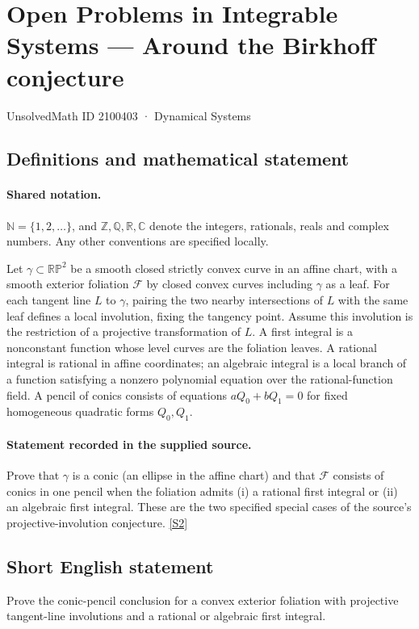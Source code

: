 \documentclass[11pt]{article}
\newcommand{\sref}[2]{\hyperlink{source:#1:#2}{[S#2]}}
\begin{document}
\setcounter{section}{2100402}
\section{Open Problems in Integrable Systems — Around the Birkhoff conjecture}\label{2100403}
{\small\sffamily UnsolvedMath ID 2100403 · Dynamical Systems}
\subsection{Definitions and mathematical statement}

\paragraph{Shared notation.}$\mathbb N=\{1,2,\ldots\}$, and $\mathbb Z,\mathbb Q,\mathbb R,\mathbb C$ denote the integers, rationals, reals and complex numbers. Any other conventions are specified locally.


Let $\gamma\subset\mathbb{RP}^2$ be a smooth closed strictly convex curve in an affine chart, with a smooth exterior foliation $\mathcal F$ by closed convex curves including $\gamma$ as a leaf. For each tangent line $L$ to $\gamma$, pairing the two nearby intersections of $L$ with the same leaf defines a local involution, fixing the tangency point. Assume this involution is the restriction of a projective transformation of $L$. A first integral is a nonconstant function whose level curves are the foliation leaves. A rational integral is rational in affine coordinates; an algebraic integral is a local branch of a function satisfying a nonzero polynomial equation over the rational-function field. A pencil of conics consists of equations $aQ_0+bQ_1=0$ for fixed homogeneous quadratic forms $Q_0,Q_1$.
\paragraph{Statement recorded in the supplied source.}
Prove that $\gamma$ is a conic (an ellipse in the affine chart) and that $\mathcal F$ consists of conics in one pencil when the foliation admits (i) a rational first integral or (ii) an algebraic first integral. These are the two specified special cases of the source's projective-involution conjecture. \sref{2100403}{2}
\subsection{Short English statement}
Prove the conic-pencil conclusion for a convex exterior foliation with projective tangent-line involutions and a rational or algebraic first integral.
\end{document}
